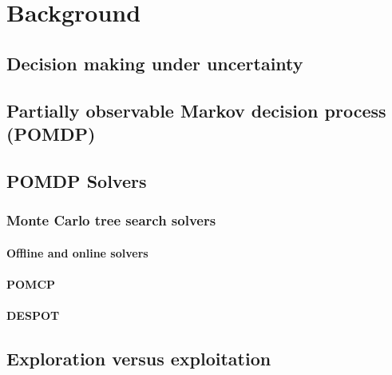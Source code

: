 \chapter{Background}
\label{sec:theory}

\section{Decision making under uncertainty}
\section{Partially observable Markov decision process (POMDP)}
\section{POMDP Solvers}
\subsection{Monte Carlo tree search solvers}
\subsubsection{Offline and online solvers}
\subsubsection{POMCP}
\subsubsection{DESPOT}
\section{Exploration versus exploitation} %
